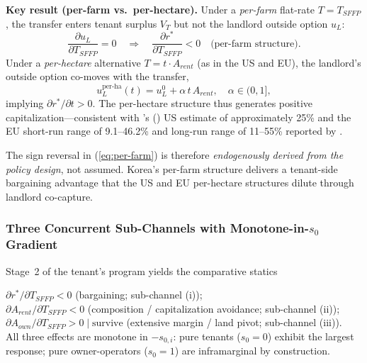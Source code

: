 \textbf{Key result (per-farm vs.\ per-hectare).} Under a \emph{per-farm} flat-rate $T = T_{SFFP}$, the transfer enters tenant surplus $V_T$ but not the landlord outside option $u_L$:
\begin{equation}
\frac{\partial u_L}{\partial T_{SFFP}} = 0 \quad \Longrightarrow \quad \frac{\partial r^*}{\partial T_{SFFP}} < 0
\quad \text{(per-farm structure)}.
\label{eq:per-farm}
\end{equation}
Under a \emph{per-hectare} alternative $T = t \cdot A_{rent}$ (as in the US and EU), the landlord's outside option co-moves with the transfer,
\begin{equation}
u_L^{\text{per-ha}}(t) = u_L^0 + \alpha\, t\, A_{rent}, \quad \alpha \in (0,1],
\label{eq:per-ha}
\end{equation}
implying $\partial r^* / \partial t > 0$. The per-hectare structure thus generates positive capitalization---consistent with \citeauthor{Kirwan2009_rentcap}'s (\citeyear{Kirwan2009_rentcap}) US estimate of approximately 25\% and the EU short-run range of 9.1--46.2\% and long-run range of 11--55\% reported by \citet{BaldoniCiaian2023_eucap}.

The sign reversal in (\ref{eq:per-farm}) is therefore \emph{endogenously derived from the policy design}, not assumed. Korea's per-farm structure delivers a tenant-side bargaining advantage that the US and EU per-hectare structures dilute through landlord co-capture.

\subsubsection{Three Concurrent Sub-Channels with Monotone-in-$s_0$ Gradient}
\label{sec:ch4-three}

Stage~2 of the tenant's program yields the comparative statics

\begin{prediction}[Channel 4]
\label{pred:ch4}
$\partial r^* / \partial T_{SFFP} < 0$ \textnormal{(bargaining; sub-channel (i))}; \\
$\partial A_{rent} / \partial T_{SFFP} < 0$ \textnormal{(composition / capitalization avoidance; sub-channel (ii))}; \\
$\partial A_{own} / \partial T_{SFFP} > 0 \mid \text{survive}$ \textnormal{(extensive margin / land pivot; sub-channel (iii))}. \\
All three effects are monotone in $-s_{0,i}$: pure tenants ($s_0 = 0$) exhibit the largest response; pure owner-operators ($s_0 = 1$) are inframarginal by construction.
\end{prediction}


